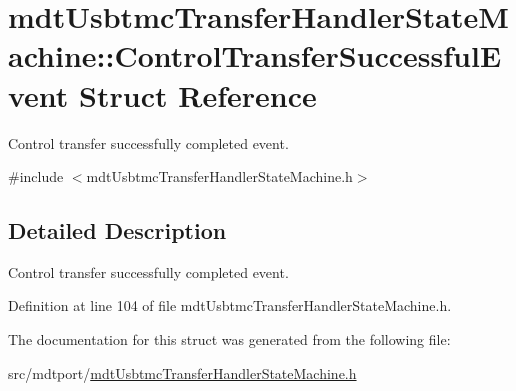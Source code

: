 \hypertarget{structmdt_usbtmc_transfer_handler_state_machine_1_1_control_transfer_successful_event}{\section{mdt\-Usbtmc\-Transfer\-Handler\-State\-Machine\-:\-:Control\-Transfer\-Successful\-Event Struct Reference}
\label{structmdt_usbtmc_transfer_handler_state_machine_1_1_control_transfer_successful_event}
}


Control transfer successfully completed event.  




{\ttfamily \#include $<$mdt\-Usbtmc\-Transfer\-Handler\-State\-Machine.\-h$>$}



\subsection{Detailed Description}
Control transfer successfully completed event. 

Definition at line 104 of file mdt\-Usbtmc\-Transfer\-Handler\-State\-Machine.\-h.



The documentation for this struct was generated from the following file\-:\begin{DoxyCompactItemize}
\item 
src/mdtport/\hyperlink{mdt_usbtmc_transfer_handler_state_machine_8h}{mdt\-Usbtmc\-Transfer\-Handler\-State\-Machine.\-h}\end{DoxyCompactItemize}

